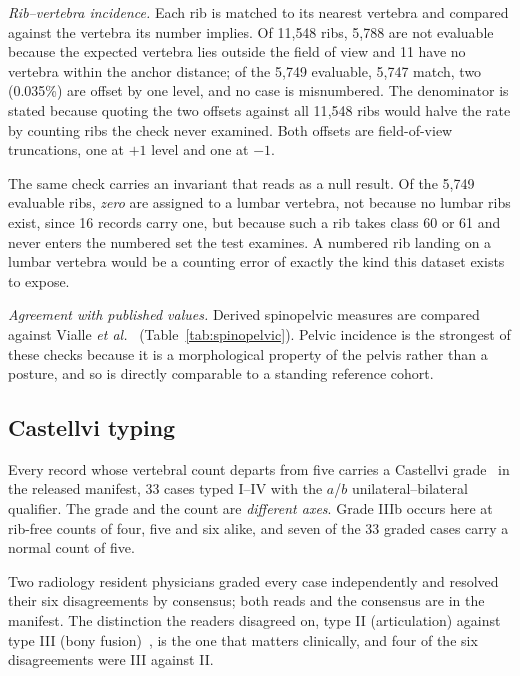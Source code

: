 \documentclass[aapm,mph,amsmath,amssymb,reprint]{revtex4-2}
\begin{document}
\emph{Rib--vertebra incidence.} Each rib is matched to its nearest vertebra and compared
against the vertebra its number implies. Of 11{,}548 ribs, 5{,}788 are not evaluable
because the expected vertebra lies outside the field of view and 11 have no vertebra within
the anchor distance; of the 5{,}749 evaluable, 5{,}747 match, two (0.035\%) are offset by one
level, and no case is misnumbered. The denominator is stated because quoting the two offsets against all 11{,}548 ribs would
halve the rate by counting ribs the check never examined. Both offsets are field-of-view
truncations, one at $+1$ level and one at $-1$.

The same check carries an invariant that reads as a null result. Of the 5{,}749 evaluable
ribs, \emph{zero} are assigned to a lumbar vertebra, not because no lumbar ribs exist,
since 16 records carry one, but because such a rib takes class 60 or 61 and never enters the
numbered set the test examines. A numbered rib landing on a lumbar vertebra would be a
counting error of exactly the kind this dataset exists to expose.

\emph{Agreement with published values.} Derived spinopelvic measures are compared against
Vialle \emph{et al.}~\cite{vialle2005} (Table~\ref{tab:spinopelvic}). Pelvic incidence is
the strongest of these checks because it is a morphological property of the pelvis rather
than a posture, and so is directly comparable to a standing reference cohort.

\subsection{Castellvi typing}

Every record whose vertebral count departs from five carries a Castellvi
grade~\cite{castellvi1984} in the released manifest, 33 cases typed I--IV with the $a$/$b$
unilateral--bilateral qualifier. The grade and the count are \emph{different axes}. Grade IIIb occurs here at rib-free counts of four, five and
six alike, and seven of the 33 graded cases carry a normal count of five.

Two radiology resident physicians graded every case independently and resolved their six
disagreements by consensus; both reads and the consensus are in the manifest. The distinction
the readers disagreed on, type II (articulation) against type III (bony
fusion)~\cite{koninwalz2010}, is the one that matters clinically, and four of the six
disagreements were III against II.
\end{document}
